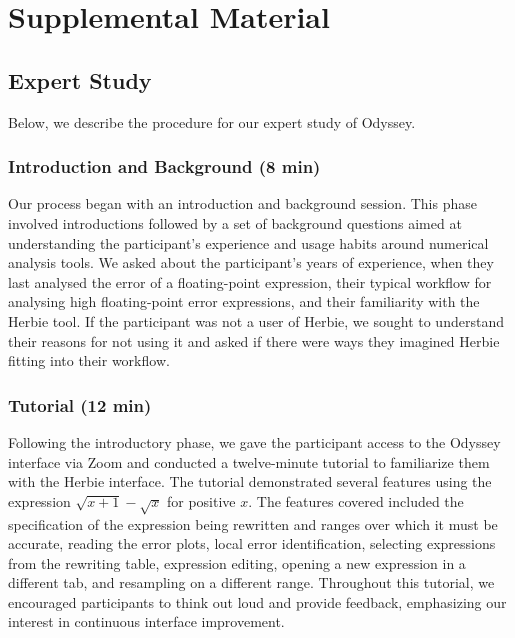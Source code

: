 


% 


% 

\section{Supplemental Material}

\subsection{Expert Study}

Below, we describe the procedure for our expert study of Odyssey.

\subsubsection{Introduction and Background (8 min)}
Our process began with an introduction and background session. 
This phase involved introductions 
  followed by a set of background questions 
  aimed at understanding the participant's experience 
  and usage habits around numerical analysis tools. 
We asked about the participant's years of experience, 
  when they last analysed 
  the error of a floating-point expression, 
  their typical workflow 
  for analysing high floating-point error expressions, 
  and their familiarity with the Herbie tool. 
If the participant was not a user of Herbie, 
  we sought to understand their reasons for not using it and 
  asked if there were ways they imagined Herbie
  fitting into their workflow.

\subsubsection{Tutorial (12 min)}
Following the introductory phase, 
  we gave the participant access to the Odyssey interface
  via Zoom and conducted a twelve-minute tutorial
  to familiarize them 
  with the Herbie interface. 
The tutorial demonstrated several features 
  using the expression $\sqrt{x + 1} - \sqrt{x}$ 
  for positive $x$. 
The features covered included 
  the specification of the expression being rewritten and ranges over which it must be accurate, 
  reading the error plots, local error identification, 
  selecting expressions from the rewriting table,
  expression editing, opening a new expression in a different tab, 
  and resampling on a different range. 
Throughout this tutorial, 
  we encouraged participants 
  to think out loud and provide feedback, 
  emphasizing our interest 
  in continuous interface improvement.


